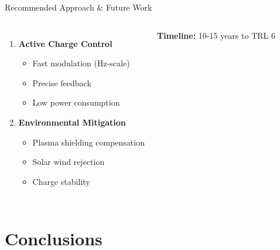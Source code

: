 \documentclass[aspectratio=169]{beamer}
\begin{document}
\begin{frame}{Recommended Approach \& Future Work}
\begin{columns}
\begin{enumerate}
    \item \textbf{Active Charge Control}
    \begin{itemize}
        \item Fast modulation (Hz-scale)
        \item Precise feedback
        \item Low power consumption
    \end{itemize}

    \item \textbf{Environmental Mitigation}
    \begin{itemize}
        \item Plasma shielding compensation
        \item Solar wind rejection
        \item Charge stability
    \end{itemize}
\end{enumerate}

\vspace{0.5em}
\textbf{Timeline:} 10-15 years to TRL 6
\end{columns}
\end{frame}

\section{Conclusions}
\end{document}
